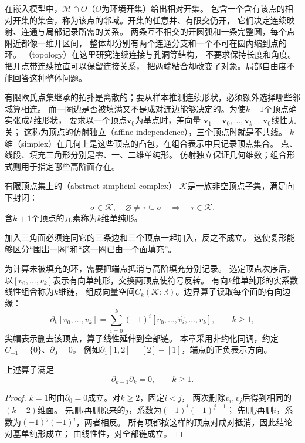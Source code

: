 \label{sec:geometry-neighborhood-topology}

在嵌入模型中，$\mathcal M\cap O$（$O$为环境开集）给出相对开集。
包含一个含有该点的相对开集的集合，称为该点的邻域。开集的任意并、有限交仍开，
它们决定连续映射、连通与局部记录所需的关系。
两条互不相交的开圆弧和一条完整圆，每个点附近都像一维开区间，
整体却分别有两个连通分支和一个不可在圆内缩到点的环。
（topology）在这里研究连续连接与孔洞等结构，
不要求保持长度和角度。把开点带连续拉直可以保留连接关系，
把两端粘合却改变了对象。局部自由度不能回答这种整体问题。

有限欧氏点集继承的拓扑是离散的；要从样本推测连续形状，必须额外选择哪些邻域算相连。
而一圈边是否被填满又不是成对连边能够决定的。为使$k+1$个顶点确实张成$k$维形状，
要求以一个顶点$\bm v_0$为基点时，差向量
$\bm v_1-\bm v_0,\ldots,\bm v_k-\bm v_0$线性无关；
这称为顶点的仿射独立（affine independence），三个顶点时就是不共线。
$k$维（simplex）在几何上是这些顶点的凸包，在组合表示中只记录顶点集合。
点、线段、填充三角形分别是零、一、二维单纯形。
仿射独立保证几何维数；组合形式则用于指定哪些高阶面存在。

\begin{definition}[抽象单纯复形]
\label{def:geometry-simplicial-complex}
有限顶点集上的（abstract simplicial complex）
$\mathcal K$是一族非空顶点子集，满足向下封闭：
\begin{equation}
 \sigma\in\mathcal K,\quad\varnothing\neq\tau\subseteq\sigma
 \quad\Longrightarrow\quad\tau\in\mathcal K.
 \label{eq:geometry-simplicial-complex-closure}
\end{equation}
含$k+1$个顶点的元素称为$k$维单纯形。
\end{definition}
加入三角面必须连同它的三条边和三个顶点一起加入，反之不成立。
这使复形能够区分“围出一圈”和“这一圈已由一个面填充”。


为计算未被填充的环，需要把端点抵消与高阶填充分别记录。
选定顶点次序后，以$[v_0,\ldots,v_k]$表示有向单纯形，交换两顶点使符号反转。
有向$k$维单纯形的实系数线性组合称为$k$维链，
组成向量空间$C_k(\mathcal K;\mathbb R)$。边界算子读取每个面的有向边缘：
\begin{equation}
 \partial_k[v_0,\ldots,v_k]
 =\sum_{i=0}^k(-1)^i[v_0,\ldots,\widehat{v_i},\ldots,v_k],
 \qquad k\geq1,
 \label{eq:geometry-simplicial-boundary}
\end{equation}
尖帽表示删去该顶点，算子线性延伸到全部链。
本章采用非约化同调，约定$C_{-1}=\{0\}$、$\partial_0=0$。
例如$\partial_1[1,2]=[2]-[1]$，端点的正负表示方向。

\begin{lemma}[边界的边界为零]
\label{lem:geometry-boundary-squared-zero}
上述算子满足
\begin{equation}
 \partial_{k-1}\partial_k=0,\qquad k\geq1.
 \label{eq:geometry-boundary-squared-zero}
\end{equation}
\end{lemma}
\begin{proof}
$k=1$时由$\partial_0=0$成立。对$k\geq2$，固定$i<j$，
两次删除$v_i,v_j$后得到相同的$(k-2)$维面。
先删$i$再删原来的$j$，系数为$(-1)^i(-1)^{j-1}$；
先删$j$再删$i$，系数为$(-1)^j(-1)^i$，两者相反。
所有项都按这样的顶点对成对抵消，因此结论对基单纯形成立；
由线性性，对全部链成立。
\end{proof}

